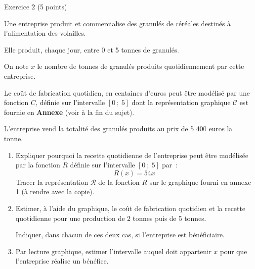 
%
\begin{h2}Exercice 2 (5 points)\end{h2}
\par
\medskip
\par
Une entreprise produit et commercialise des granulés de céréales destinés à l'alimentation des volailles.
\par
Elle produit, chaque jour, entre 0 et 5 tonnes de granulés.
\par
On note $x$ le nombre de tonnes de granulés produits quotidiennement par cette entreprise.
\par
Le coût de fabrication quotidien, en centaines d'euros peut être modélisé par une fonction $C$, définie sur l'intervalle $[0~;~5]$  dont la représentation graphique $\mathscr{C}$ est fournie en \textbf{Annexe} (voir à la fin du sujet).
\par
L'entreprise vend la totalité des granulés produits au prix de 5 400 euros la tonne.
\par
%
%
\par
\begin{enumerate}
     \item Expliquer pourquoi la recette quotidienne de l'entreprise peut être modélisée par la fonction $R$ définie sur l'intervalle $[0~;~5]$ par~:
     \[ R(x)= 54x \]
     Tracer la représentation $\mathscr{R}$ de la fonction $R$ sur le graphique fourni en annexe 1 (à rendre avec la copie).
     \par
     \medskip
     \par
     \item Estimer, à l'aide du graphique, le coût de fabrication quotidien et la recette quotidienne pour une production de 2 tonnes puis de 5 tonnes.
     \par
     Indiquer, dans chacun de ces deux cas, si l'entreprise est bénéficiaire.
     \par
     \medskip
     \par
     \item Par lecture graphique, estimer l'intervalle auquel doit appartenir $x$ pour que l'entreprise réalise un bénéfice.
\end{enumerate}
